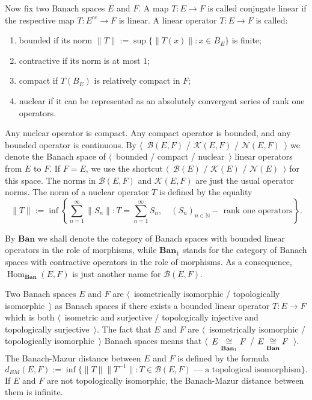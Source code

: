 Now fix two Banach spaces $E$ and $F$. A map $T:E\to F$ is called conjugate
linear if the respective map $T:E^{cc}\to F$ is linear. A linear operator
$T:E\to F$ is called:
\begin{enumerate}[label = (\roman*)]
  \item bounded if its norm $\lVert T\rVert:=\sup \{\lVert T(x)\rVert:x\in B_E \}$ 
  is finite;

  \item contractive if its norm is at most $1$;

  \item compact if $T(B_E)$ is relatively compact in $F$;

  \item nuclear if it can be represented as an absolutely convergent series of
  rank one operators.
\end{enumerate}

Any nuclear operator is compact. Any compact operator is
bounded, and any bounded operator is continuous. By $\langle$~$\mathcal{B}(E,F)$ /
$\mathcal{K}(E,F)$ / $\mathcal{N}(E,F)$~$\rangle$ we denote the Banach space of
$\langle$~bounded / compact / nuclear~$\rangle$ linear operators from $E$ to
$F$. If $F=E$, we use the shortcut $\langle$~$\mathcal{B}(E)$ / $\mathcal{K}(E)$
/ $\mathcal{N}(E)$~$\rangle$ for this space. The norms in $\mathcal{B}(E,F)$ and
$\mathcal{K}(E,F)$ are just the usual operator norms. The norm of a nuclear
operator $T$ is defined by the equality
\[
\lVert T\rVert
:=\inf\left \{
  \sum_{n=1}^\infty\lVert S_n\rVert
  :T=\sum_{n=1}^\infty S_n,\quad 
  {(S_n)}_{n\in\mathbb{N}} - \mbox{ rank one operators}
\right \}.
\]

By $\mathbf{Ban}$ we shall denote the category of Banach spaces with bounded
linear operators in the role of morphisms, while $\mathbf{Ban}_1$ stands for the
category of Banach spaces with contractive operators in the role of morphisms.
As a consequence, $\operatorname{Hom}_{\mathbf{Ban}}(E,F)$ is just another
name for $\mathcal{B}(E,F)$.

Two Banach spaces $E$ and $F$ are $\langle$~isometrically isomorphic /
topologically isomorphic~$\rangle$ as Banach spaces if there exists a bounded
linear operator $T:E\to F$ which is both $\langle$~isometric and surjective /
topologically injective and topologically surjective~$\rangle$. The fact that
$E$ and $F$ are $\langle$~isometrically isomorphic / topologically
isomorphic~$\rangle$ Banach spaces means that
$\langle$~$E\mathrel{\mathop{\cong}\limits_{\mathbf{Ban}_1}}F$ / $E\mathrel{\mathop{\cong}\limits_{\mathbf{Ban}}}F$~$\rangle$. The
Banach-Mazur distance between $E$ and $F$ is defined by the formula 
\[
d_{BM}(E,F):=\inf \{
  \lVert T\rVert\lVert T^{-1}\rVert
  :T \in \mathcal{B}(E,F) \mbox{ --- a topological isomorphism}
 \}.
\] 
If $E$ and $F$ are not topologically isomorphic, the Banach-Mazur distance
between them is infinite.


